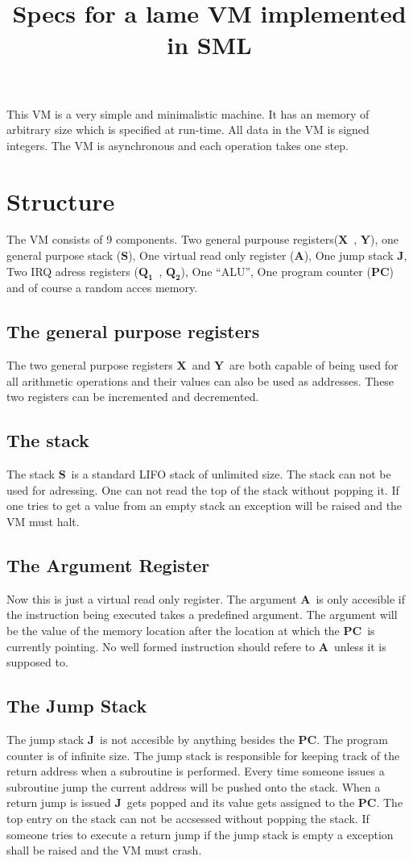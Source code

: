 \documentclass{article}
\title{Specs for a lame VM implemented in SML}
\newcommand{\x}{$\textbf{X}$}
\newcommand{\y}{$\textbf{Y}$}
\newcommand{\s}{$\textbf{S}$}
\newcommand{\A}{$\textbf{A}$}
\newcommand{\q}{$\textbf{Q}_{\textbf{1}}$}
\newcommand{\qq}{$\textbf{Q}_{\textbf{2}}$}
\newcommand{\pc}{$\textbf{PC}$}
\newcommand{\J}{$\textbf{J}$}
\begin{document}
\maketitle
This VM is a very simple and minimalistic machine. It has an memory of
arbitrary size which is specified at run-time. All data in the VM is signed
integers. The VM is asynchronous and each operation takes one step.
\section{Structure}
The VM consists of 9 components. Two general purpouse registers(\x \ , \y ), one
general purpose stack (\s), One virtual read only register (\A), One jump stack
\J, Two IRQ adress registers (\q \ , \qq), One ``ALU'', One program counter
(\pc) and of course a random acces memory.

\subsection{The general purpose registers}
The two general purpose registers \x \ and \y \ are both capable of being used
for all arithmetic operations and their values can also be used as addresses.
These two registers can be incremented and decremented.

\subsection{The stack}
The stack \s \ is a standard LIFO stack of unlimited size. The stack can not be
used for adressing. One can not read the top of the stack without popping it. If
one tries to get a value from an empty stack an exception will be raised and the
VM must halt.

\subsection{The Argument Register}
Now this is just a virtual read only register. The argument \A \  is only
accesible if the instruction being executed takes a predefined argument. The
argument will be the value of the memory location after the location at which
the \pc \  is currently pointing. No well formed instruction should refere to
\A \ unless it is supposed to.

\subsection{The Jump Stack}
The jump stack \J \ is not accesible by anything besides the \pc. The program
counter is of infinite size. The jump stack is responsible for keeping track
of the return address when a subroutine is performed. Every time someone
issues a subroutine jump the current address will be pushed onto the stack.
When a return jump is issued \J \ gets popped and its value gets assigned to
the \pc. The top entry on the stack can not be accsessed without popping the
stack.
If someone tries to execute a return jump if the jump stack is empty a exception 
shall be raised and the VM must crash.
\end{document}
